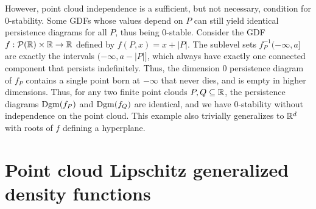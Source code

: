However, point cloud independence is a sufficient, but not necessary, condition
for 0-stability. Some GDFs whose values depend on $P$ can still yield identical
persistence diagrams for all $P$, thus being $0$-stable. Consider the GDF
$f : \mathcal{P}(\mathbb{R}) \times \mathbb{R} \to \mathbb{R}$ defined by $f(P, x) = x + |P|$. The
sublevel sets $f_P^{-1}(-\infty, a]$ are exactly the intervals
$(-\infty, a - |P|]$, which always have exactly one connected component
that persists indefinitely. Thus, the dimension $0$ persistence diagram of $f_P$
contains a single point born at $-\infty$ that never dies, and is empty
in higher dimensions. Thus, for any two finite point clouds $P, Q \subseteq \mathbb{R}$,
the persistence diagrams $\operatorname{Dgm}(f_P)$ and $\operatorname{Dgm}(f_Q)$ are identical, and we have
$0$-stability without independence on the point cloud.
This example also trivially generalizes to $\mathbb{R}^d$ with roots of $f$ defining a
hyperplane.

\section{Point cloud Lipschitz generalized density functions}

